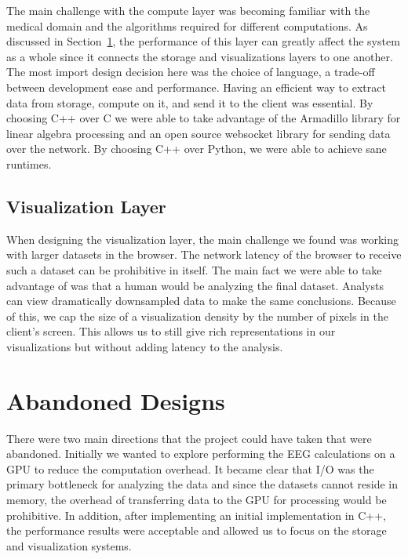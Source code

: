 The main challenge with the compute layer was becoming familiar with the
medical domain and the algorithms required for different computations. As
discussed in Section~\ref{discuss-ch:abandon}, the performance of this layer
can greatly affect the system as a whole since it connects the storage and
visualizations layers to one another. The most import design decision here was
the choice of language, a trade-off between development ease and performance.
Having an efficient way to extract data from storage, compute on it, and send
it to the client was essential. By choosing C++ over C we were able to take
advantage of the Armadillo \cite{arma} library for linear algebra processing
and an open source websocket library \cite{websocket-server} for sending data
over the network. By choosing C++ over Python, we were able to achieve
sane runtimes.

\subsection{Visualization Layer}

When designing the visualization layer, the main challenge we found was working
with larger datasets in the browser. The network latency of the browser to
receive such a dataset can be prohibitive in itself. The main fact we were able
to take advantage of was that a human would be analyzing the final dataset.
Analysts can view dramatically downsampled data to make the same conclusions.
Because of this, we cap the size of a visualization density by the number of
pixels in the client's screen. This allows us to still give rich
representations in our visualizations but without adding latency to the
analysis.

\section{Abandoned Designs}\label{discuss-ch:abandon}

There were two main directions that the project could have taken that were
abandoned. Initially we wanted to explore performing the EEG calculations on a
GPU to reduce the computation overhead. It became clear that I/O was the
primary bottleneck for analyzing the data and since the datasets cannot reside
in memory, the overhead of transferring data to the GPU for processing would be
prohibitive. In addition, after implementing an initial implementation in C++,
the performance results were acceptable and allowed us to focus on the storage
and visualization systems. \\

